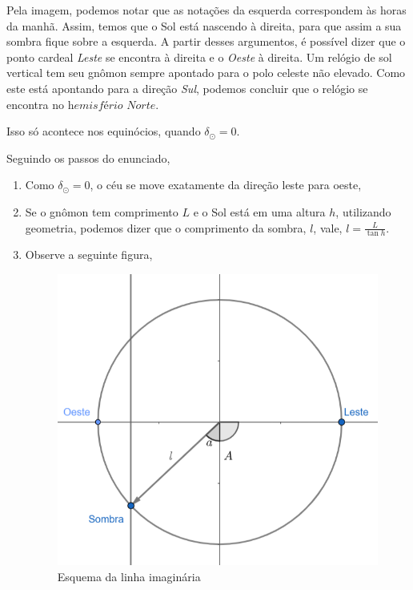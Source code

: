 \documentclass[11pt]{article}
\begin{document}
\begin{pproblem}
\begin{pssolution*}{}{}
    \begin{alternativas}
        \item Pela imagem, podemos notar que as notações da esquerda correspondem às horas da manhã. Assim, temos que o Sol está nascendo à direita, para que assim a sua sombra fique sobre a esquerda. A partir desses argumentos, é possível dizer que o ponto cardeal \textit{Leste} se encontra à direita e o \textit{Oeste} à direita. Um relógio de sol vertical tem seu gnômon sempre apontado para o polo celeste não elevado. Como este está apontando para a direção \textit{Sul}, podemos concluir que o relógio se encontra no \(\boxed{\textit{hemisfério Norte}}\).

        \item Isso só acontece nos equinócios, quando \(\delta_\odot = 0\).

        \item Seguindo os passos do enunciado, 
        \begin{enumerate}[label=\roman*)]
            \item Como \(\delta_\odot=0\), o céu se move exatamente da direção leste para oeste, 
            \item Se o gnômon tem comprimento \(L\) e o Sol está em uma altura \(h\), utilizando geometria, podemos dizer que o comprimento da sombra, \(l\), vale, \(l=\frac{L}{\tan h}\).
            \item Observe a seguinte figura, 
            \begin{figure}[H]
                \centering
                \includegraphics[width=0.66\linewidth]{imagens/retarelogiosolvert.png}
                \caption{Esquema da linha imaginária}
            \end{figure}
        \end{enumerate}


\end{alternativas}
\end{pssolution*}
\end{pproblem}
\end{document}
